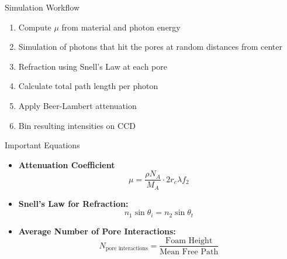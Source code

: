 \documentclass[aspectratio=169,xcolor=dvipsnames]{beamer}
\begin{document}
\begin{frame}{Simulation Workflow}
  \begin{enumerate}
    \item Compute $\mu$ from material and photon energy
    \item Simulation of photons that hit the pores at random distances from center
    \item Refraction using Snell's Law at each pore
    \item Calculate total path length per photon
    \item Apply Beer-Lambert attenuation
    \item Bin resulting intensities on CCD
\end{enumerate}
\end{frame}


\begin{frame}{Important Equations}
\begin{itemize}
  \item \textbf{Attenuation Coefficient}
  \[
    \mu = \frac{\rho N_A}{M_A} \cdot 2 r_e \lambda f_2
  \]
  \item \textbf{Snell's Law for Refraction:}
  \[
    n_1 \sin\theta_i = n_2 \sin\theta_t
  \]
  \item \textbf{Average Number of Pore Interactions:}
  \[
    N_{\text{pore interactions}} = \frac{\text{Foam Height}}{\text{Mean Free Path}}
  \]
\end{itemize}

\end{frame}
\end{document}
